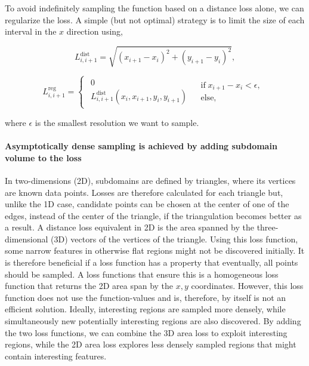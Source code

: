 To avoid indefinitely sampling the function based on a distance loss alone, we can regularize the loss.
A simple (but not optimal) strategy is to limit the size of each interval in the $x$ direction using,

\begin{equation*}
L_{i, i+1}^\textrm{dist}=\sqrt{(x_{i+1}-x_{i})^{2}+(y_{i+1}-y_{i})^{2}},
\end{equation*}

\begin{equation*}
L_{i,i+1}^\textrm{reg}=\begin{cases}
\begin{array}{c}
0\\
L_{i, i+1}^\textrm{dist}(x_i, x_{i+1}, y_i, y_{i+1})
\end{array} & \begin{array}{c}
\textrm{if} \; x_{i+1}-x_{i}<\epsilon,\\
\textrm{else,}
\end{array}\end{cases}
\end{equation*}

where $\epsilon$ is the smallest resolution we want to sample.

\hypertarget{asymptotically-dense-sampling-is-achieved-by-adding-subdomain-volume-to-the-loss}{%
\paragraph{Asymptotically dense sampling is achieved by adding subdomain volume to the loss}\label{asymptotically-dense-sampling-is-achieved-by-adding-subdomain-volume-to-the-loss}}

In two-dimensions (2D), subdomains are defined by triangles, where its vertices are known data points.
Losses are therefore calculated for each triangle but, unlike the 1D case, candidate points can be chosen at the center of one of the edges, instead of the center of the triangle, if the triangulation becomes better as a result.
A distance loss equivalent in 2D is the area spanned by the three-dimensional (3D) vectors of the vertices of the triangle.
Using this loss function, some narrow features in otherwise flat regions might not be discovered initially.
It is therefore beneficial if a loss function has a property that eventually, all points should be sampled.
A loss functions that ensure this is a homogeneous loss function that returns the 2D area span by the $x, y$ coordinates.
However, this loss function does not use the function-values and is, therefore, by itself is not an efficient solution.
Ideally, interesting regions are sampled more densely, while simultaneously new potentially interesting regions are also discovered.
By adding the two loss functions, we can combine the 3D area loss to exploit interesting regions, while the 2D area loss explores less densely sampled regions that might contain interesting features.

